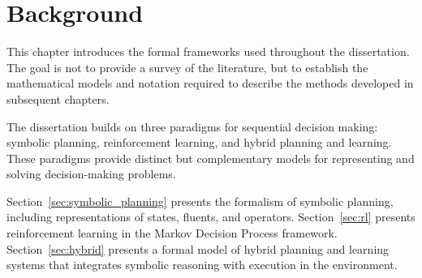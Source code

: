 \chapter{Background}

This chapter introduces the formal frameworks used throughout the dissertation. The goal is not to provide a survey of the literature, but to establish the mathematical models and notation required to describe the methods developed in subsequent chapters.

The dissertation builds on three paradigms for sequential decision making: symbolic planning, reinforcement learning, and hybrid planning and learning. These paradigms provide distinct but complementary models for representing and solving decision-making problems.


Section~\ref{sec:symbolic_planning} presents the formalism of symbolic planning, including representations of states, fluents, and operators. Section~\ref{sec:rl} presents reinforcement learning in the Markov Decision Process framework. Section~\ref{sec:hybrid} presents a formal model of hybrid planning and learning systems that integrates symbolic reasoning with execution in the environment.





